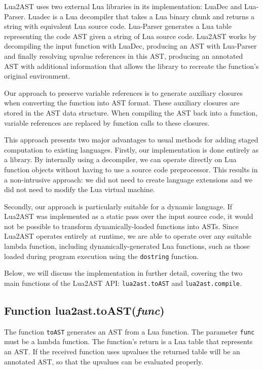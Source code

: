 \documentclass[english]{llncs}
\begin{document}
Lua2AST uses two external Lua libraries in its implementation: LuaDec and Lua-Parser.
Luadec \cite{luadec} is a Lua decompiler that takes a Lua binary chunk and returns a string with equivalent Lua source code.
Lua-Parser \cite{lua-parser} generates a Lua table representing the code AST given a string of Lua source code.
Lua2AST works by decompiling the input function with LuaDec, producing an AST with Lua-Parser
and finally resolving upvalue references in this AST, producing an annotated AST
with additional information that allows the library to recreate the function's original
environment.

Our approach to preserve variable references is to generate auxiliary closures
when converting the function into AST format. These auxiliary closures are
stored in the AST data structure. When compiling the AST back into a function,
variable references are replaced by function calls to these closures.

This approach presents two major advantages to usual methods for adding staged computation to existing languages.
Firstly, our implementation is done entirely as a library. 
By internally using a decompiler, we can operate directly on Lua function objects
without having to use a source code preprocessor.
This results in a non-intrusive approach: we did not need to create language extensions and we did not need to modify the Lua virtual machine.

Secondly, our approach is particularly suitable for a dynamic language.
If Lua2AST was implemented as a static pass over the input source code,
it would not be possible to transform dynamically-loaded functions into ASTs.
Since Lua2AST operates entirely at runtime, we are able to operate over
any suitable lambda function, including dynamically-generated Lua functions,
such as those loaded during program execution using the \texttt{dostring} function.

Below, we will discuss the implementation in further detail, covering the two main functions
of the Lua2AST API: \texttt{lua2ast.toAST} and \texttt{lua2ast.compile}.

\subsection{Function lua2ast.toAST(\emph{func})}

The function \texttt{toAST} generates an AST from a Lua function.
The parameter \texttt{func} must be a lambda function.
The function's return is a Lua table that represents an AST.
If the received function uses upvalues the returned table will be an annotated AST, so that the upvalues can be evaluated properly.
\end{document}
